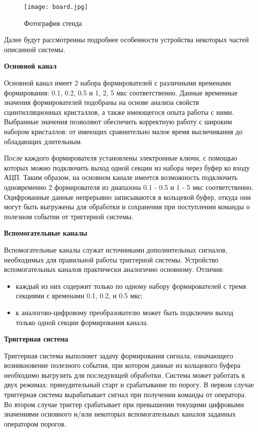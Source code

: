 \begin{figure}[ht]
    \centering
    \texttt{[image: board.jpg]}
    \caption{Фотография стенда}
    \label{fig:board}
\end{figure}
Далее будут рассмотренны подробнее особенности устройства некоторых частей описанной системы.\par
\textbf{Основной канал}\par
Основной канал имеет 2 набора формирователей с различными временами формирования: 0.1, 0.2, 0.5 и 1, 2, 5 мкс соответственно. Данные временные значения формирователей подобраны на основе анализа свойств сцинтилляционных кристаллов, а также имеющегося опыта работы с ними. Выбранные значения позволяют обеспечить корректную работу с широким набором кристаллов: от имеющих сравнительно малое время высвечивания до обладающих длительным.\par
После каждого формирователя установлены электронные ключи, с помощью которых можно подключить выход одной секции из набора через буфер ко входу АЦП. Таким образом, на основном канале имеется возможность подключить одновременно 2 формирователя из диапазона 0.1 - 0.5 и 1 - 5 мкс соответственно. Оцифрованные данные непрерывно записываются в кольцевой буфер, откуда они могут быть выгружены для обработки и сохранения при поступлении команды о полезном событии от триггерной системы.\par
\textbf{Вспомогательные каналы}\par
Вспомогательные каналы служат источниками дополнительных сигналов, необходимых для правильной работы триггерной системы. Устройство вспомогательных каналов практически аналогично основному. Отличия:\par
\begin{itemize}
    \item каждый из них содержит только по одному набору формирователей с тремя секциями с временами 0.1, 0.2, и 0.5 мкс;
    \item к аналогово-цифровому преобразователю может быть подключен выход только одной секции формирования канала.
\end{itemize}\par
\textbf{Триггерная система}\par
Триггерная система выполняет задачу формирования сигнала, означающего возникновение полезного события, при котором данные из кольцевого буфера необходимо выгрузить для последующей обработки. Система может работать в двух режимах: принудительный старт и срабатывание по порогу. В первом случае триггерная система вырабатывает сигнал при получении команды от оператора. Во втором случае триггер срабатывает при превышении текущими цифровыми значениями основного и/или некоторых вспомогательных каналов заданных оператором порогов.
